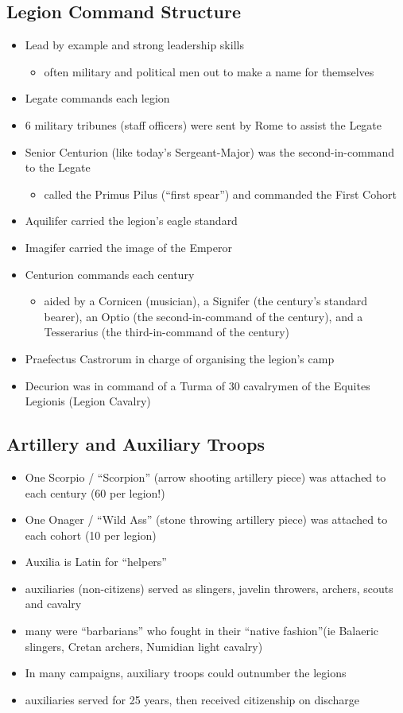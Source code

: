 \documentclass[12pt, twoside]{article}
\begin{document}
\subsection{Legion Command Structure}
\begin{itemize}
\item Lead by example and strong leadership skills
	\begin{itemize}
	\item often military and political men out to make a name for themselves
	\end{itemize}
\item Legate commands each legion 
\item 6 military tribunes (staff officers) were sent by Rome to assist the Legate
\item Senior Centurion (like today’s Sergeant-Major) was the second-in-command to the Legate
	\begin{itemize}
	\item called the Primus Pilus (“first spear”) and commanded the First Cohort 
	\end{itemize}
\item Aquilifer carried the legion’s eagle standard
\item Imagifer carried the image of the Emperor
\item Centurion commands each century 
	\begin{itemize}
	\item aided by a Cornicen (musician), a Signifer (the century’s standard bearer), an Optio (the second-in-command of the century), and a Tesserarius (the third-in-command of the century)
	\end{itemize}
\item Praefectus Castrorum in charge of organising the legion’s camp
\item Decurion was in command of a Turma of 30 cavalrymen of the Equites Legionis (Legion Cavalry)
\end{itemize}

\subsection{Artillery and Auxiliary Troops}
\begin{itemize}
\item One Scorpio / “Scorpion” (arrow shooting artillery piece) was attached to each century (60 per legion!) 
\item One Onager / “Wild Ass” (stone throwing artillery piece) was attached to each cohort (10 per legion) 
\item Auxilia is Latin for “helpers”
\item auxiliaries (non-citizens) served as slingers, javelin throwers, archers, scouts and cavalry
\item many were “barbarians” who fought in their “native fashion”(ie Balaeric slingers, Cretan archers, Numidian light cavalry)
\item In many campaigns, auxiliary troops could outnumber the legions
\item auxiliaries served for  25 years, then received  citizenship on discharge
\end{itemize}
\end{document}
